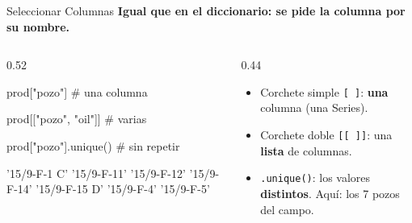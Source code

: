 \documentclass[aspectratio=169, 11pt]{beamer}
\begin{document}
\begin{frame}[fragile,shrink=15]{Seleccionar Columnas}
  \vspace{-4pt}
  {\small\color{arcaDark}\bfseries
    Igual que en el diccionario: se pide la columna \textbf{por su nombre}.}

  \vspace{4pt}
  \begin{columns}[T]
    \begin{column}{0.52\textwidth}
      \begin{pyblock}
prod["pozo"]           # una columna

prod[["pozo", "oil"]]  # varias

prod["pozo"].unique()  # sin repetir
      \end{pyblock}
      \vspace{2pt}
      \begin{outputblock}
'15/9-F-1 C' '15/9-F-11'
'15/9-F-12'  '15/9-F-14'
'15/9-F-15 D' '15/9-F-4'
'15/9-F-5'
      \end{outputblock}
    \end{column}

    \begin{column}{0.44\textwidth}
      {\scriptsize\color{textMuted}
      \begin{itemize}\setlength{\itemsep}{5pt}
        \item[{\color{arcaRed}\scriptsize\faArrowRight}]
          Corchete simple \texttt{[ ]}: \textbf{una}
          columna (una Series).
        \item[{\color{arcaRed}\scriptsize\faArrowRight}]
          Corchete doble \texttt{[[ ]]}: una
          \textbf{lista} de columnas.
        \item[{\color{arcaRed}\scriptsize\faArrowRight}]
          \texttt{.unique()}: los valores
          \textbf{distintos}. Aquí: los 7 pozos
          del campo.
      \end{itemize}
      }
    \end{column}
  \end{columns}
\end{frame}
\end{document}
